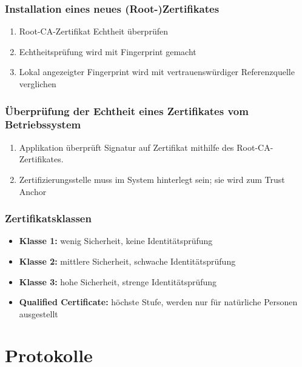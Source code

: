 \documentclass[12pt]{scrartcl}
\begin{document}
\subsubsection{Installation eines neues (Root-)Zertifikates}

\begin{enumerate}
    \item Root-CA-Zertifikat Echtheit überprüfen
    \item Echtheitsprüfung wird mit Fingerprint gemacht
    \item Lokal angezeigter Fingerprint wird mit vertrauenswürdiger Referenzquelle verglichen
\end{enumerate}


\subsubsection{Überprüfung der Echtheit eines Zertifikates vom Betriebssystem}

\begin{enumerate}
    \item Applikation überprüft Signatur auf Zertifikat mithilfe des Root-CA-Zertifikates.
    \item Zertifizierungsstelle muss im System hinterlegt sein; sie wird zum Trust Anchor
\end{enumerate}



\subsubsection{Zertifikatsklassen}

\begin{itemize}
    \item \textbf{Klasse 1:} wenig Sicherheit, keine Identitätsprüfung
    \item \textbf{Klasse 2:} mittlere Sicherheit, schwache Identitätsprüfung
    \item \textbf{Klasse 3:} hohe Sicherheit, strenge Identitätsprüfung
    \item \textbf{Qualified Certificate:} höchste Stufe, werden nur für natürliche Personen ausgestellt
\end{itemize}


\newpage
\section{Protokolle}
\end{document}

